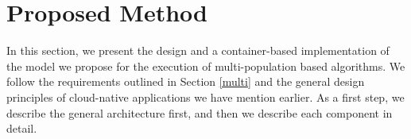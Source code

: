 \documentclass[review]{elsarticle}
\begin{document}
\section{Proposed Method} 
\label{method} 



In this section, we present the design
and a container-based implementation of the model we propose for the execution
of multi-population based algorithms. We follow the requirements outlined in
Section \ref{multi} and the general design principles of cloud-native
applications we have mention earlier. As a first step, we describe the general
architecture first, and then we describe each component in detail. 
\end{document}
